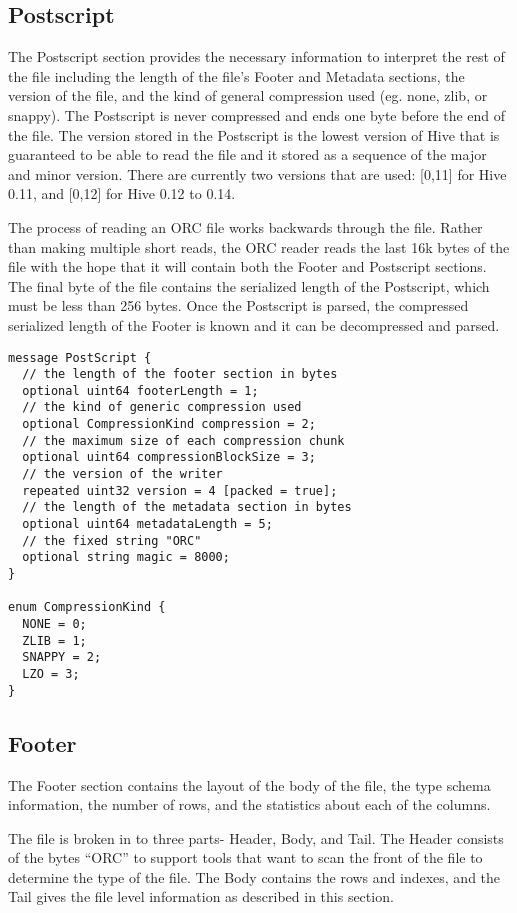 \documentclass{article}
\begin{document}
\subsection{Postscript}

The Postscript section provides the necessary information to interpret
the rest of the file including the length of the file's Footer and
Metadata sections, the version of the file, and the kind of general
compression used (eg. none, zlib, or snappy). The Postscript is never
compressed and ends one byte before the end of the file.  The version
stored in the Postscript is the lowest version of Hive that is
guaranteed to be able to read the file and it stored as a sequence of
the major and minor version. There are currently two versions that are
used: [0,11] for Hive 0.11, and [0,12] for Hive 0.12 to 0.14.

The process of reading an ORC file works backwards through the
file. Rather than making multiple short reads, the ORC reader reads
the last 16k bytes of the file with the hope that it will contain both
the Footer and Postscript sections. The final byte of the file
contains the serialized length of the Postscript, which must be less
than 256 bytes. Once the Postscript is parsed, the compressed
serialized length of the Footer is known and it can be decompressed
and parsed.

\begin{verbatim}
message PostScript {
  // the length of the footer section in bytes
  optional uint64 footerLength = 1;
  // the kind of generic compression used
  optional CompressionKind compression = 2;
  // the maximum size of each compression chunk
  optional uint64 compressionBlockSize = 3;
  // the version of the writer
  repeated uint32 version = 4 [packed = true];
  // the length of the metadata section in bytes
  optional uint64 metadataLength = 5;
  // the fixed string "ORC"
  optional string magic = 8000;
}

enum CompressionKind {
  NONE = 0;
  ZLIB = 1;
  SNAPPY = 2;
  LZO = 3;
}
\end{verbatim}

\subsection{Footer}

The Footer section contains the layout of the body of the file, the
type schema information, the number of rows, and the statistics about
each of the columns.

The file is broken in to three parts- Header, Body, and Tail. The
Header consists of the bytes ``ORC'' to support tools that want to
scan the front of the file to determine the type of the file. The Body
contains the rows and indexes, and the Tail gives the file level
information as described in this section.
\end{document}

